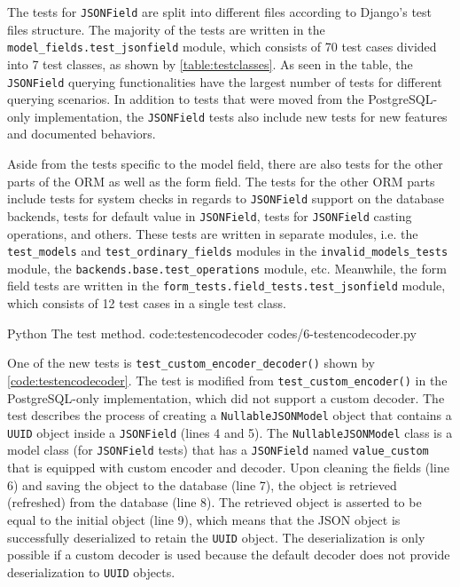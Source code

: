 The tests for \verb|JSONField| are split into different files according to
Django's test files structure. The majority of the tests are written in the
\verb|model_fields.test_jsonfield| module, which consists of 70 test cases
divided into 7 test classes, as shown by \autoref{table:testclasses}. As seen
in the table, the \verb|JSONField| querying functionalities have the largest
number of tests for different querying scenarios. In addition to tests that
were moved from the PostgreSQL-only implementation, the \verb|JSONField| tests
also include new tests for new features and documented behaviors.

Aside from the tests specific to the model field, there are also tests for the
other parts of the ORM as well as the form field. The tests for the other ORM
parts include tests for system checks in regards to \verb|JSONField| support on
the database backends, tests for default value in \verb|JSONField|, tests for
\verb|JSONField| casting operations, and others. These tests are written in
separate modules, i.e. the \verb|test_models| and \verb|test_ordinary_fields|
modules in the \verb|invalid_models_tests| module, the
\verb|backends.base.test_operations| module, etc. Meanwhile, the form field
tests are written in the \verb|form_tests.field_tests.test_jsonfield| module,
which consists of 12 test cases in a single test class.

\listing
{Python}
{The  test method.}
{code:testencodecoder}
{codes/6-testencodecoder.py}

One of the new tests is \verb|test_custom_encoder_decoder()| shown by
\autoref{code:testencodecoder}. The test is modified from
\verb|test_custom_encoder()| in the PostgreSQL-only implementation, which did
not support a custom decoder. The test describes the process of creating a
\verb|NullableJSONModel| object that contains a \verb|UUID| object inside a
\verb|JSONField| (lines 4 and 5). The \verb|NullableJSONModel| class is a model
class (for \verb|JSONField| tests) that has a \verb|JSONField| named
\verb|value_custom| that is equipped with custom encoder and decoder.  Upon
cleaning the fields (line 6) and saving the object to the database (line 7),
the object is retrieved (refreshed) from the database (line 8). The retrieved
object is asserted to be equal to the initial object (line 9), which means that
the JSON object is successfully deserialized to retain the \verb|UUID| object.
The deserialization is only possible if a custom decoder is used because the
default decoder does not provide deserialization to \verb|UUID| objects.

